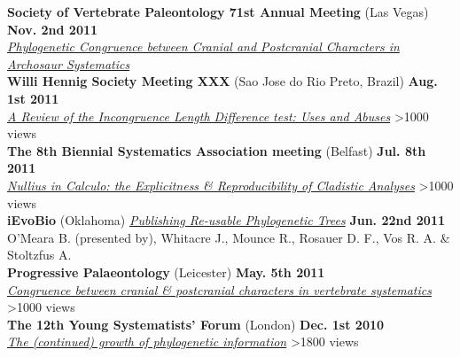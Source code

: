 \documentclass[margin,line]{resume}
\begin{document}
\begin{resume}
\vspace{-7 mm}    
    \textbf{Society of Vertebrate Paleontology 71st Annual Meeting} (Las Vegas) \hfill \textbf{Nov. 2nd 2011}\\
    \textsl{\href{http://www.slideshare.net/rossmounce/phylogenetic-congruence-between-cranial-and-postcranial-characters-in-archosaur-systematics}{Phylogenetic Congruence between Cranial and Postcranial Characters in Archosaur Systematics}}\\

\vspace{-7 mm} 
    \textbf{Willi Hennig Society Meeting XXX} (Sao Jose do Rio Preto, Brazil) \hfill \textbf{Aug. 1st 2011}\\
    \textsl{\href{http://prezi.com/prj21wcwdlx5/ild-review/}{A Review of the Incongruence Length Difference test: Uses and Abuses}} \hfill {\color{red} \textgreater1000 views}\\

\vspace{-7 mm} 
    \textbf{The 8th Biennial Systematics Association meeting} (Belfast)
 \hfill \textbf{Jul. 8th 2011}\\
    \textsl{\href{http://prezi.com/rwyvfb9bvec_/nullius-in-calculo/}{Nullius in Calculo: the Explicitness \& Reproducibility of Cladistic Analyses}}\hfill {\color{red} \textgreater 1000 views}\\

\vspace{-7 mm} 
    \textbf{iEvoBio} (Oklahoma) \textsl{\href{http://dx.doi.org/10.1038/npre.2011.6048.1}{Publishing Re-usable Phylogenetic Trees}} \hfill \textbf{Jun. 22nd 2011}\\
    O'Meara B. (presented by), Whitacre J., Mounce R., Rosauer D. F., Vos R. A. \& Stoltzfus A.\\

\vspace{-7 mm} 
\textbf{Progressive Palaeontology} (Leicester)
 \hfill \textbf{May. 5th 2011}\\
    \textsl{\href{http://www.slideshare.net/rossmounce/progpal2011}{Congruence between cranial \& postcranial characters in vertebrate systematics}}\hfill {\color{red} \textgreater 1000 views}\\

\vspace{-7 mm} 
\textbf{The 12th Young Systematists' Forum} (London)
 \hfill \textbf{Dec. 1st 2010}\\
    \textsl{\href{http://prezi.com/1s0lkatmc30t/the-continued-growth-of-phylogenetic-information/}{The (continued) growth of phylogenetic information}}\hfill {\color{red} \textgreater 1800 views}\\


\end{resume}
\end{document}
